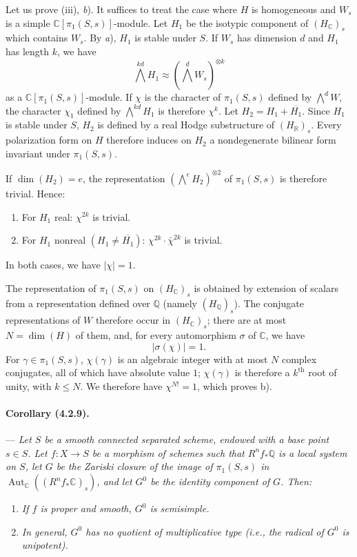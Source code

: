 \documentclass[10pt]{article}
\newcommand{\C}{\mathbb C}
\newcommand{\Q}{\mathbb Q}
\newcommand{\R}{\mathbb R}
\providecommand{\Aut}{\operatorname{Aut}}
\begin{document}
Let us prove (iii), \textit{b}). It suffices to treat the case where $H$ is homogeneous and $W_s$ is a simple $\C[\pi_1(S,s)]$-module. Let $H_1$ be the isotypic component of $(H_\C)_s$ which contains $W_s$. By \textit{a}), $H_1$ is stable under $S$. If $W_s$ has dimension $d$ and $H_1$ has length $k$, we have
\[
\bigwedge^{kd}H_1\approx(\bigwedge^dW_s)^{\otimes k}
\]
as a $\C[\pi_1(S,s)]$-module. If $\chi$ is the character of $\pi_1(S,s)$ defined by $\bigwedge^dW$, the character $\chi_1$ defined by $\bigwedge^{kd}H_1$ is therefore $\chi^k$. Let $H_2=H_1+\overline{H_1}$. Since $H_1$ is stable under $S$, $H_2$ is defined by a real Hodge substructure of $(H_\R)_s$. Every polarization form on $H$ therefore induces on $H_2$ a nondegenerate bilinear form invariant under $\pi_1(S,s)$.

If $\dim(H_2)=e$, the representation $(\bigwedge^eH_2)^{\otimes2}$ of $\pi_1(S,s)$ is therefore trivial. Hence:
\begin{enumerate}[label=\alph*)]
\item For $H_1$ real: $\chi^{2k}$ is trivial.
\item For $H_1$ nonreal $(H_1\ne\overline{H_1})$: $\chi^{2k}\cdot\bar\chi^{2k}$ is trivial.
\end{enumerate}
In both cases, we have $|\chi|=1$.

The representation of $\pi_1(S,s)$ on $(H_\C)_s$ is obtained by extension of scalars from a representation defined over $\Q$ (namely $(H_\Q)_s$). The conjugate representations of $W$ therefore occur in $(H_\C)_s$; there are at most $N=\dim(H)$ of them, and, for every automorphism $\sigma$ of $\C$, we have
\[
|\sigma(\chi)|=1.
\]
For $\gamma\in\pi_1(S,s)$, $\chi(\gamma)$ is an algebraic integer with at most $N$ complex conjugates, all of which have absolute value $1$; $\chi(\gamma)$ is therefore a $k^{\text{th}}$ root of unity, with $k\le N$. We therefore have $\chi^{N!}=1$, which proves b).

\paragraph{Corollary (4.2.9).} --- {\itshape Let $S$ be a smooth connected separated scheme, endowed with a base point $s\in S$. Let $f:X\to S$ be a morphism of schemes such that $R^nf_*\Q$ is a local system on $S$, let $G$ be the Zariski closure of the image of $\pi_1(S,s)$ in $\Aut_\C((R^nf_*\C)_s)$, and let $G^0$ be the identity component of $G$. Then:}
\begin{enumerate}[label=\alph*)]
\item {\itshape If $f$ is proper and smooth, $G^0$ is semisimple.}
\item {\itshape In general, $G^0$ has no quotient of multiplicative type (i.e., the radical of $G^0$ is unipotent).}
\end{enumerate}
\end{document}
